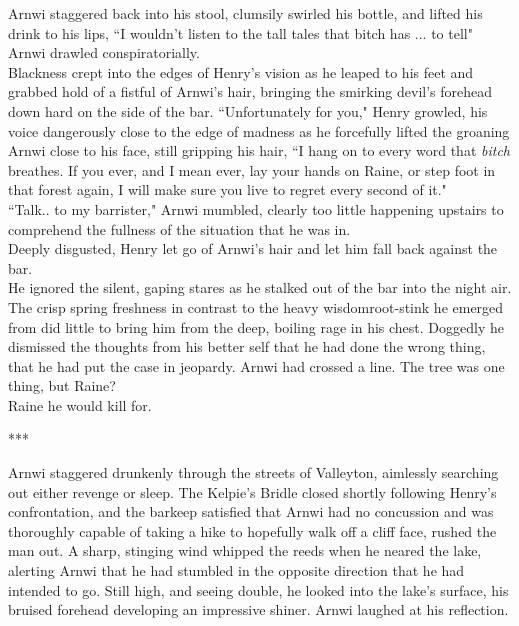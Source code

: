 Arnwi staggered back into his stool, clumsily swirled his bottle, and lifted his drink to his lips, ``I wouldn't listen to the tall tales that bitch has ... to tell" Arnwi drawled conspiratorially.\\

Blackness crept into the edges of Henry's vision as he leaped to his feet and grabbed hold of a fistful of Arnwi's hair, bringing the smirking devil's forehead down hard on the side of the bar.
``Unfortunately for you," Henry growled, his voice dangerously close to the edge of madness as he forcefully lifted the groaning Arnwi close to his face, still gripping his hair, ``I hang on to every word that \textit{bitch} breathes. If you ever, and I mean ever, lay your hands on Raine, or step foot in that forest again, I will make sure you live to regret every second of it."\\

``Talk.. to my barrister," Arnwi mumbled, clearly too little happening upstairs to comprehend the fullness of the situation that he was in.\\
Deeply disgusted, Henry let go of Arnwi's hair and let him fall back against the bar.\\
He ignored the silent, gaping stares as he stalked out of the bar into the night air. The crisp spring freshness in contrast to the heavy wisdomroot-stink he emerged from did little to bring him from the deep, boiling rage in his chest.
Doggedly he dismissed the thoughts from his better self that he had done the wrong thing, that he had put the case in jeopardy. 
Arnwi had crossed a line.
The tree was one thing, but Raine?\\

Raine he would kill for.

\begin{center}
    ***
\end{center}

Arnwi staggered drunkenly through the streets of Valleyton, aimlessly searching out either revenge or sleep.
The Kelpie's Bridle closed shortly following Henry's confrontation, and the barkeep satisfied that Arnwi had no concussion and was thoroughly capable of taking a hike to hopefully walk off a cliff face, rushed the man out.
A sharp, stinging wind whipped the reeds when he neared the lake, alerting Arnwi that he had stumbled in the opposite direction that he had intended to go.
Still high, and seeing double, he looked into the lake's surface, his bruised forehead developing an impressive shiner.
Arnwi laughed at his reflection.\\

